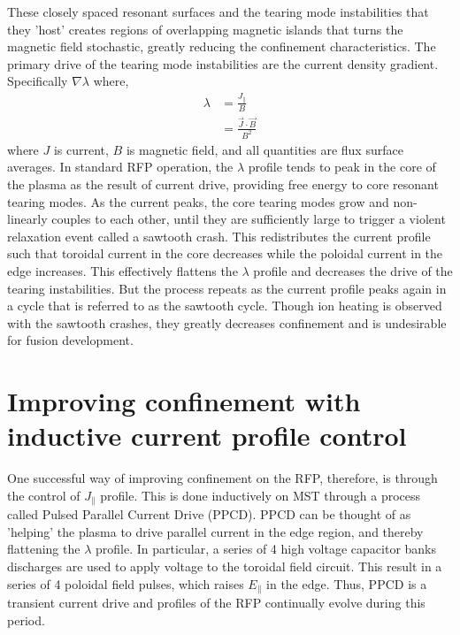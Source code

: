 \begin{refsection}
These closely spaced resonant surfaces and the tearing mode instabilities that they 'host' creates regions of overlapping magnetic islands that turns the magnetic field stochastic, greatly reducing the confinement characteristics. The primary drive of the tearing mode instabilities are the current density gradient\cite{Schnack1987,Ho1991}. Specifically $\nabla\lambda$ where,
\begin{align}
    \lambda &= \frac{J_{\parallel}}{B}\\
    &= \frac{\vec{J}\cdot\vec{B}}{B^2}\nonumber
\end{align}
where $J$ is current, $B$ is magnetic field, and all quantities are flux surface averages. In standard RFP operation, the $\lambda$ profile tends to peak in the core of the plasma as the result of current drive, providing free energy to core resonant tearing modes. As the current peaks, the core tearing modes grow and non-linearly couples to each other, until they are sufficiently large to trigger a violent relaxation event called a sawtooth crash. This redistributes the current profile such that toroidal current in the core decreases while the poloidal current in the edge increases\cite{Terry2004}. This effectively flattens the $\lambda$ profile and decreases the drive of the tearing instabilities. But the process repeats as the current profile peaks again in a cycle that is referred to as the sawtooth cycle. Though ion heating is observed with the sawtooth crashes\cite{Bodin1980}, they greatly decreases confinement and is undesirable for fusion development.

\section{Improving confinement with inductive current profile control}

One successful way of improving confinement on the RFP, therefore, is through the control of $J_{\parallel}$ profile. This is done inductively on MST through a process called Pulsed Parallel Current Drive (PPCD). PPCD can be thought of as 'helping' the plasma to drive parallel current in the edge region, and thereby flattening the $\lambda$ profile\cite{Sarff1995}. In particular, a series of 4 high voltage capacitor banks discharges are used to apply voltage to the toroidal field circuit. This result in a series of 4 poloidal field pulses, which raises $E_{\parallel}$ in the edge. Thus, PPCD is a transient current drive and profiles of the RFP continually evolve during this period. 


\end{refsection}
